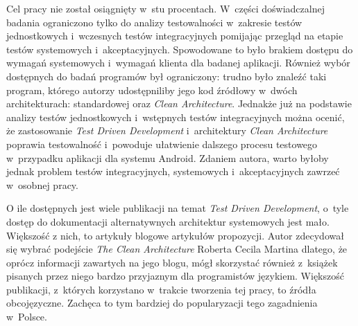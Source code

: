 Cel pracy nie został osiągnięty w~stu procentach. W~części doświadczalnej badania ograniczono tylko do analizy testowalności w~zakresie testów jednostkowych i~wczesnych testów integracyjnych pomijając przegląd na etapie testów systemowych i~akceptacyjnych. Spowodowane to było brakiem dostępu do wymagań systemowych i~wymagań klienta dla badanej aplikacji. Również wybór dostępnych do badań programów był ograniczony: trudno było znaleźć taki program, którego autorzy udostępniliby jego kod źródłowy w~dwóch architekturach: standardowej oraz \textit{Clean Architecture}. Jednakże już na podstawie analizy testów jednostkowych i~wstępnych testów integracyjnych można ocenić, że zastosowanie \textit{Test Driven Development} i~architektury \textit{Clean Architecture} poprawia testowalność i~powoduje ułatwienie dalszego procesu testowego w~przypadku aplikacji dla systemu Android. Zdaniem autora, warto byłoby jednak problem testów integracyjnych, systemowych i~akceptacyjnych zawrzeć w~osobnej pracy.

O ile dostępnych jest wiele publikacji na temat \textit{Test Driven Development}, o~tyle dostęp do dokumentacji alternatywnych architektur systemowych jest mało. Większość z nich, to artykuły blogowe artykułów propozycji. Autor zdecydował się wybrać podejście \textit{The Clean Architecture} Roberta Cecila Martina dlatego, że oprócz informacji zawartych na jego blogu, mógł skorzystać również z~książek pisanych przez niego bardzo przyjaznym dla programistów językiem. Większość publikacji, z~których korzystano w~trakcie tworzenia tej pracy, to źródła obcojęzyczne. Zachęca to tym bardziej do popularyzacji tego zagadnienia w~Polsce.

